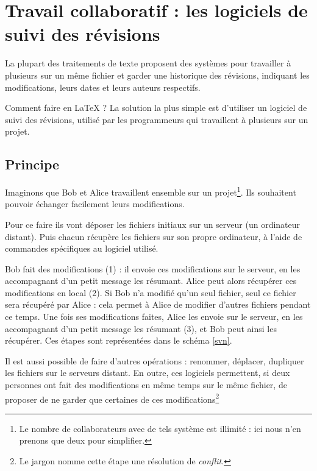 \chapter{Travail collaboratif : les logiciels de suivi des révisions}\label{principesvn}	%

\begin{prealable}
	La plupart des traitements de texte proposent des systèmes pour travailler à plusieurs sur un même fichier et garder une historique des révisions, indiquant les modifications, leurs dates et leurs auteurs respectifs. 
	
	Comment faire en \LaTeX{} ? La solution la plus simple est d'utiliser un logiciel de suivi des révisions, utilisé par les programmeurs qui travaillent à plusieurs sur un projet.
\end{prealable}

\section{Principe}
Imaginons que Bob et Alice travaillent ensemble sur un projet\footnote{Le nombre de collaborateurs avec de tels système est illimité : ici nous n'en prenons que deux pour simplifier.}. Ils souhaitent pouvoir échanger facilement leurs modifications.

Pour ce faire ils vont déposer les fichiers initiaux sur un serveur (un ordinateur distant). Puis chacun récupère les fichiers sur son propre ordinateur, à l'aide de commandes spécifiques au logiciel utilisé.

Bob fait des modifications (1) : il envoie ces modifications sur le serveur, en les accompagnant d'un petit message les résumant. Alice peut alors récupérer ces modifications en local (2). Si Bob n'a modifié qu'un seul fichier, seul ce fichier sera récupéré par Alice : cela permet à Alice de modifier d'autres fichiers pendant ce temps. Une fois ses modifications faites, Alice les envoie sur le serveur, en les accompagnant d'un petit message les résumant (3), et Bob peut ainsi les récupérer. Ces étapes sont représentées dans le schéma \ref{svn}. 

Il est aussi possible de faire d'autres opérations : renommer, déplacer, dupliquer les fichiers sur le serveurs distant. En outre, ces logiciels permettent, si deux personnes ont fait des modifications en même temps sur le même fichier, de proposer de ne garder que certaines de ces modifications\footnote{Le jargon nomme cette étape une résolution de \emph{conflit}.}

